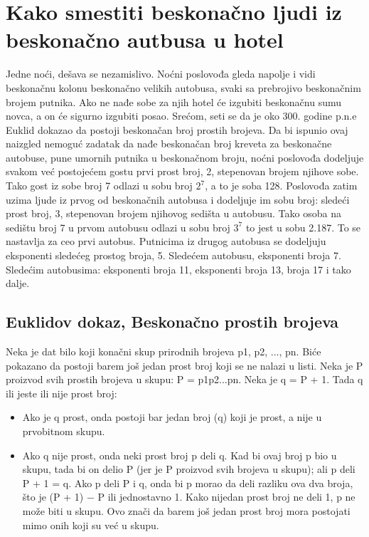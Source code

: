\documentclass[a4paper]{article}
\begin{document}
\section{Kako smestiti beskonačno ljudi iz beskonačno autbusa u hotel}
Jedne noći, dešava se nezamislivo. Noćni poslovođa gleda napolje i vidi beskonačnu kolonu beskonačno velikih autobusa, svaki sa prebrojivo beskonačnim brojem putnika. Ako ne nađe sobe za njih hotel će izgubiti beskonačnu sumu novca, a on će sigurno izgubiti posao. Srećom, seti se da je oko 300. godine p.n.e Euklid dokazao da postoji beskonačan broj prostih brojeva. Da bi ispunio ovaj naizgled nemoguć zadatak da nađe beskonačan broj kreveta za beskonačne autobuse, pune umornih putnika u beskonačnom broju, noćni poslovođa dodeljuje svakom već postojećem gostu prvi prost broj, 2, stepenovan brojem njihove sobe. Tako gost iz sobe broj 7 odlazi u sobu broj $2^7$, a to je soba 128. Poslovođa zatim uzima ljude iz prvog od beskonačnih autobusa i dodeljuje im sobu broj: sledeći prost broj, 3, stepenovan brojem njihovog sedišta u autobusu. Tako osoba na sedištu broj 7 u prvom autobusu odlazi u sobu broj $3^7$ to jest u sobu 2.187. To se nastavlja za ceo prvi autobus. Putnicima iz drugog autobusa se dodeljuju eksponenti sledećeg prostog broja, 5. Sledećem autobusu, eksponenti broja 7. Sledećim autobusima: eksponenti broja 11, eksponenti broja 13, broja 17 i tako dalje.

\subsection{Euklidov dokaz, Beskonačno prostih brojeva}
Neka je dat bilo koji konačni skup prirodnih brojeva p1, p2, ..., pn. Biće pokazano da postoji barem još jedan prost broj koji se ne nalazi u listi. Neka je P proizvod svih prostih brojeva u skupu: P = p1p2...pn. Neka je q = P + 1. Tada q ili jeste ili nije prost broj:
\begin{itemize}
\item Ako je q prost, onda postoji bar jedan broj (q) koji je prost, a nije u prvobitnom skupu.
\item Ako q nije prost, onda neki prost broj p deli q. Kad bi ovaj broj p bio u skupu, tada bi on delio P (jer je P proizvod svih brojeva u skupu); ali p deli P + 1 = q. Ako p deli P i q, onda bi p morao da deli razliku
\cite{objasnjenje_deljenja} ova dva broja, što je (P + 1) − P ili jednostavno 1. Kako nijedan prost broj ne deli 1, p ne može biti u skupu. Ovo znači da barem još jedan prost broj mora postojati mimo onih koji su već u skupu.
\end{itemize} 
\end{document}

